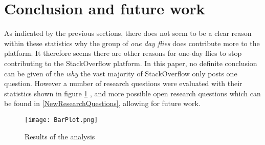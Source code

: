 \documentclass[conference]{IEEEtran}
\begin{document}
\section{Conclusion and future work}

As indicated by the previous sections, there does not seem to be a clear reason
within these statistics why the group of \textit{one day flies} does contribute
more to the platform. It therefore seems there are other reasons for one-day
flies to stop contributing to the StackOverflow platform. In this paper, no
definite conclusion can be given of the \textit{why} the vast majority of
StackOverflow only posts one question. However a number of research questions
were evaluated with their statistics shown in figure \ref{finalResults} , and
more possible open research questions which can be found in
\ref{NewResearchQuestions}, allowing for future work.

\begin{figure}[h]
 \texttt{[image: BarPlot.png]}
 \caption{Results of the analysis}
 \label{finalResults}
\end{figure}





\end{document}
